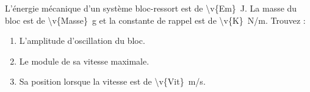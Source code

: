 L’énergie mécanique d’un système bloc-ressort est de \qty{\v{Em}}{J}. La masse du bloc est de \qty{\v{Masse}}{g} et la constante de rappel est de \qty{\v{K}}{N/m}. Trouvez :

\begin{enumerate}[label=\alph*)]
    \item L’amplitude d’oscillation du bloc.
    \item Le module de sa vitesse maximale.
    \item Sa position lorsque la vitesse est de \qty{\v{Vit}}{m/s}.
\end{enumerate}